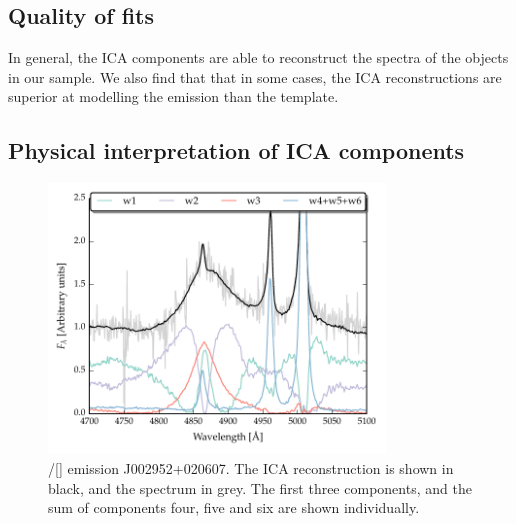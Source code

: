 \subsection{Quality of fits}

In general, the ICA components are able to reconstruct the spectra of the objects in our sample. 
We also find that that in some cases, the ICA reconstructions are superior at modelling the  emission than the \citet{boroson92} template. 

\subsection{Physical interpretation of ICA components}

\begin{figure}[t!]
    \centering
    \includegraphics[width=0.8\textwidth]{figures/chapter04/mfica_components.pdf} 
    \caption{\hbns/[] emission J002952+020607. The ICA reconstruction is shown in black, and the spectrum in grey. The first three components, and the sum of components four, five and six are shown individually.}     
    \label{fig:mfica_components}
\end{figure}

